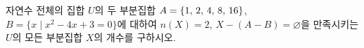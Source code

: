 자연수 전체의 집합 $U$의 두 부분집합 $A=\{1,\mkern3mu 2,\mkern3mu 4,\mkern3mu 8,\mkern3mu 16\}$, $B=\{x \mid x^2-4x+3=0\}$에 대하여 $n(X)=2$, $X-(A-B)=\varnothing$을 만족시키는 $U$의 모든 부분집합 $X$의 개수를 구하시오.

